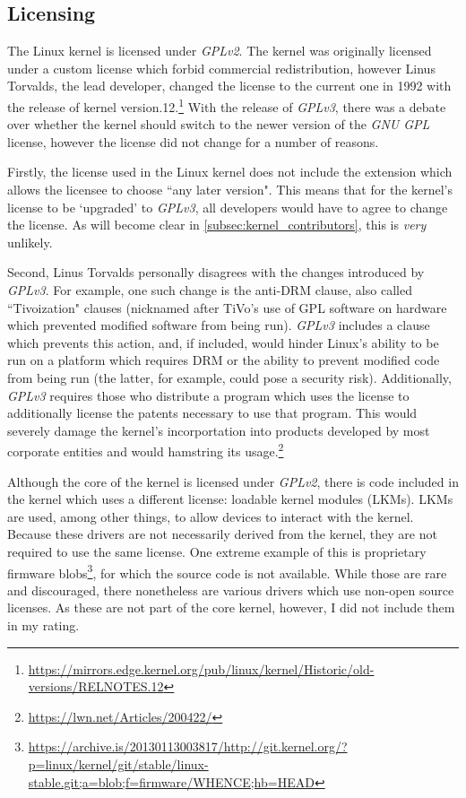 \documentclass[11pt]{article}
\begin{document}
\subsection{Licensing}
\label{subsec:kernel_license}

The Linux kernel is licensed under \textit{GPLv2}.  The kernel was originally licensed under a custom license which forbid commercial redistribution, however Linus Torvalds, the lead developer, changed the license to the current one in 1992 with the release of kernel version.12.\footnote{\url{https://mirrors.edge.kernel.org/pub/linux/kernel/Historic/old-versions/RELNOTES.12}}  With the release of \textit{GPLv3}, there was a debate over whether the kernel should switch to the newer version of the \textit{GNU GPL} license, however the license did not change for a number of reasons.

Firstly, the license used in the Linux kernel does not include the extension which allows the licensee to choose ``any later version".  This means that for the kernel's license to be `upgraded' to \textit{GPLv3}, all developers would have to agree to change the license.  As will become clear in \ref{subsec:kernel_contributors}, this is \textit{very} unlikely.

Second, Linus Torvalds personally disagrees with the changes introduced by \textit{GPLv3}.  For example, one such change is the anti-DRM clause, also called ``Tivoization" clauses (nicknamed after TiVo's use of GPL software on hardware which prevented modified software from being run).  \textit{GPLv3} includes a clause which prevents this action, and, if included, would hinder Linux's ability to be run on a platform which requires DRM or the ability to prevent modified code from being run (the latter, for example, could pose a security risk).  Additionally, \textit{GPLv3} requires those who distribute a program which uses the license to additionally license the patents necessary to use that program.  This would severely damage the kernel's incorportation into products developed by most corporate entities and would hamstring its usage.\footnote{\url{https://lwn.net/Articles/200422/}}

Although the core of the kernel is licensed under \textit{GPLv2}, there is code included in the kernel which uses a different license: loadable kernel modules (LKMs).  LKMs are used, among other things, to allow devices to interact with the kernel.  Because these drivers are not necessarily derived from the kernel, they are not required to use the same license.  One extreme example of this is proprietary firmware blobs\footnote{\url{https://archive.is/20130113003817/http://git.kernel.org/?p=linux/kernel/git/stable/linux-stable.git;a=blob;f=firmware/WHENCE;hb=HEAD}}, for which the source code is not available.  While those are rare and discouraged, there nonetheless are various drivers which use non-open source licenses.  As these are not part of the core kernel, however, I did not include them in my rating.
\end{document}
